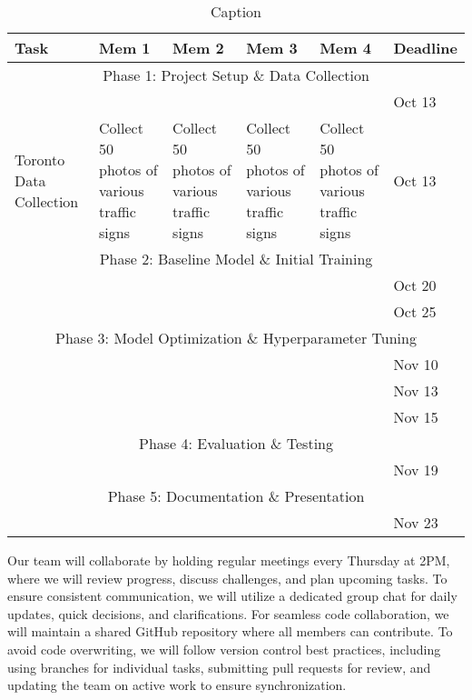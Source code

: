 \documentclass{article} %
\begin{document}
\begin{table}
    \centering
    \begin{tabular}{|p{2cm}|p{2.5cm}|p{2.5cm}|p{2.5cm}|p{2.5cm}|p{1.5cm}|} \hline 
         Task&  Mem 1&  Mem 2&  Mem 3&  Mem 4& Deadline\\ \hline 
         \multicolumn{6}{|c|}{Phase 1: Project Setup \& Data Collection}\\ \hline 
         &  &  &  &  & Oct 13\\ \hline 
         Toronto Data Collection&  Collect 50 photos of various traffic signs&  Collect 50 photos of various traffic signs&  Collect 50 photos of various traffic signs&  Collect 50 photos of various traffic signs& Oct 13\\ \hline 
         \multicolumn{6}{|c|}{Phase 2: Baseline Model \& Initial Training}\\ \hline 
         &  &  &  &  & Oct 20\\ \hline 
         &  &  &  &  & Oct 25\\ \hline 
         \multicolumn{6}{|c|}{Phase 3: Model Optimization \& Hyperparameter Tuning}\\ \hline 
         &  &  &  &  & Nov 10\\ \hline 
 & & & & &Nov 13\\ \hline 
 & & & & &Nov 15\\ \hline 
 \multicolumn{6}{|c|}{Phase 4: Evaluation \& Testing}\\ \hline 
 & & & & &Nov 19\\ \hline 
 \multicolumn{6}{|c|}{Phase 5: Documentation \& Presentation}\\ \hline 
         &  &  &  &  & Nov 23\\ \hline
    \end{tabular}
    
    \caption{Caption}
    \label{tab:my_label}
\end{table}

Our team will collaborate by holding regular meetings every Thursday at 2PM, where we will review progress, discuss challenges, and plan upcoming tasks. To ensure consistent communication, we will utilize a dedicated group chat for daily updates, quick decisions, and clarifications. For seamless code collaboration, we will maintain a shared GitHub repository where all members can contribute. To avoid code overwriting, we will follow version control best practices, including using branches for individual tasks, submitting pull requests for review, and updating the team on active work to ensure synchronization.
\end{document}
